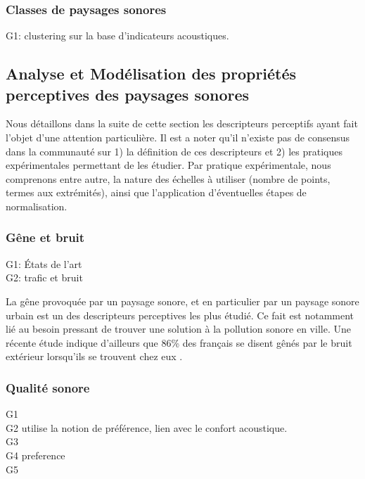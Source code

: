 \subsubsection{Classes de paysages sonores}

G1: \citep{rychtarikova2013soundscape,torija2013application} clustering sur la base d'indicateurs acoustiques.

\subsection{Analyse et Modélisation des propriétés perceptives des paysages sonores}
\label{sec:descripteursPercetifs}

Nous détaillons dans la suite de cette section les descripteurs perceptifs ayant fait l'objet d'une attention particulière. Il est a noter qu'il n'existe pas de consensus dans la communauté sur 1) la définition de ces descripteurs et 2) les pratiques expérimentales permettant de les étudier. Par pratique expérimentale, nous comprenons entre autre, la nature des échelles à utiliser (nombre de points, termes aux extrémités), ainsi que l'application d'éventuelles étapes de normalisation. 

\subsubsection{Gêne et bruit}

G1: \citep{marquis2005noisea,marquis2005noiseb} États de l'art\\
G2: \citep{gille2016testing,gille2016noise,gille2016dose,morel2016noise,trolle2015perception,marquis2015simulated,klein2015spectral} trafic et  bruit 

La gêne provoquée par un paysage sonore, et en particulier par un paysage sonore urbain est un des descripteurs perceptives les plus étudié. Ce fait est notamment lié au besoin pressant de trouver une solution à la pollution sonore en ville. Une récente étude indique d'ailleurs que 86\% des français se disent gênés par le bruit extérieur lorsqu'ils se trouvent chez eux \citep{noiseFrench}. \\

\subsubsection{Qualité sonore}

G1 \citep{brocolini2012prediction,ricciardi2015sound} \\
G2 \citep{hong2013designing} utilise la notion de préférence, lien avec le confort acoustique.\\
G3 \citep{ozcevik2012laboratory}\\
G4 \citep{yu2010factors} preference\\
G5 \citep{nilsson2006soundscape,nilsson2007acoustic}

